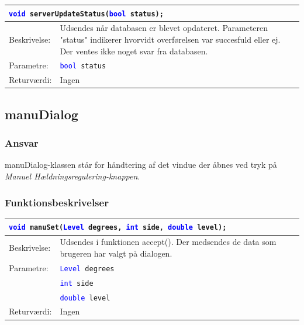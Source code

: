 \begin{table}[H]
\begin{tabular}{l p{12.5cm}}
\multicolumn{2}{l}{\texttt{\textcolor{blue}{void} serverUpdateStatus(\textcolor{blue}{bool} status);}} \\
\hline
Beskrivelse: &Udsendes når databasen er blevet opdateret. Parameteren "status" indikerer hvorvidt overførelsen var succesfuld eller ej. Der ventes ikke noget svar fra databasen.\\
Parametre:&\texttt{\textcolor{blue}{bool} status}\\
Returværdi:&Ingen\\
\end{tabular}
\end{table}



\subsection{manuDialog}
\subsubsection{Ansvar}
manuDialog-klassen står for håndtering af det vindue der åbnes ved tryk på \textit{Manuel Hældningsregulering-knappen}.
\subsubsection{Funktionsbeskrivelser}

\begin{table}[H]
\begin{tabular}{l p{12.5cm}}
\multicolumn{2}{l}{\texttt{\textcolor{blue}{void} manuSet(\textcolor{blue}{Level} degrees, \textcolor{blue}{int} side, \textcolor{blue}{double} level);}} \\
\hline
Beskrivelse: &Udsendes i funktionen accept(). Der medsendes de data som brugeren har valgt på dialogen.\\
Parametre:&\texttt{\textcolor{blue}{Level} degrees}\\
&\texttt{\textcolor{blue}{int} side}\\
&\texttt{\textcolor{blue}{double} level}\\
Returværdi:&Ingen\\
\end{tabular}
\end{table}

